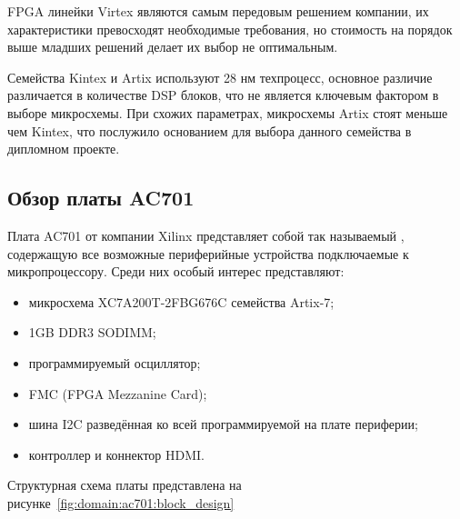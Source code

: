 FPGA линейки Virtex являются самым передовым решением компании, их характеристики превосходят необходимые требования,
но стоимость на порядок выше младших решений делает их выбор не оптимальным.

Семейства Kintex и Artix используют 28 нм техпроцесс, основное различие различается в количестве DSP блоков, что не является
ключевым фактором в выборе микросхемы. При схожих параметрах, микросхемы Artix стоят меньше чем Kintex\cite{artix_kintex_price_comparison},
что послужило основанием для выбора данного семейства в дипломном проекте.





\subsection{Обзор платы AC701}
\label{sub:domain:ac701}

Плата AC701 от компании Xilinx представляет собой так называемый ,
содержащую все возможные периферийные устройства подключаемые к микропроцессору.
Среди них особый интерес представляют:
\begin{itemize}
  \item микросхема XC7A200T-2FBG676C семейства Artix-7;
  \item 1GB DDR3 SODIMM;
  \item программируемый осциллятор;
  \item FMC (FPGA Mezzanine Card);
  \item шина I2C разведённая ко всей программируемой на плате периферии;
  \item контроллер и коннектор HDMI.
\end{itemize}

Структурная схема платы представлена на рисунке~\ref{fig:domain:ac701:block_design}

